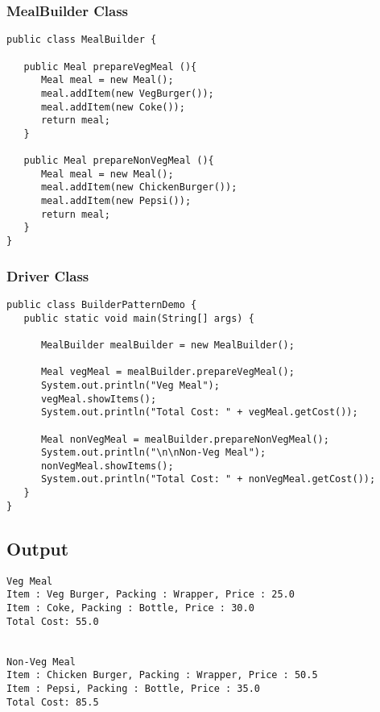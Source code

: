 \subsubsection{MealBuilder Class}

\begin{verbatim}
public class MealBuilder {

   public Meal prepareVegMeal (){
      Meal meal = new Meal();
      meal.addItem(new VegBurger());
      meal.addItem(new Coke());
      return meal;
   }   

   public Meal prepareNonVegMeal (){
      Meal meal = new Meal();
      meal.addItem(new ChickenBurger());
      meal.addItem(new Pepsi());
      return meal;
   }
}
\end{verbatim}

\subsubsection{Driver Class}

\begin{verbatim}
public class BuilderPatternDemo {
   public static void main(String[] args) {
   
      MealBuilder mealBuilder = new MealBuilder();

      Meal vegMeal = mealBuilder.prepareVegMeal();
      System.out.println("Veg Meal");
      vegMeal.showItems();
      System.out.println("Total Cost: " + vegMeal.getCost());

      Meal nonVegMeal = mealBuilder.prepareNonVegMeal();
      System.out.println("\n\nNon-Veg Meal");
      nonVegMeal.showItems();
      System.out.println("Total Cost: " + nonVegMeal.getCost());
   }
}
\end{verbatim}

\subsection{Output}

\begin{verbatim}
Veg Meal
Item : Veg Burger, Packing : Wrapper, Price : 25.0
Item : Coke, Packing : Bottle, Price : 30.0
Total Cost: 55.0


Non-Veg Meal
Item : Chicken Burger, Packing : Wrapper, Price : 50.5
Item : Pepsi, Packing : Bottle, Price : 35.0
Total Cost: 85.5
\end{verbatim}